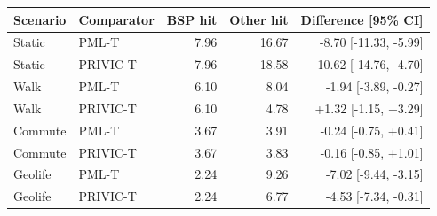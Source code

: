 \begin{tabular}{llrrr}
\toprule
Scenario & Comparator & BSP hit & Other hit & Difference [95\% CI] \\
\midrule
Static & PML-T & 7.96 & 16.67 & -8.70 [-11.33, -5.99] \\
Static & PRIVIC-T & 7.96 & 18.58 & -10.62 [-14.76, -4.70] \\
Walk & PML-T & 6.10 & 8.04 & -1.94 [-3.89, -0.27] \\
Walk & PRIVIC-T & 6.10 & 4.78 & +1.32 [-1.15, +3.29] \\
Commute & PML-T & 3.67 & 3.91 & -0.24 [-0.75, +0.41] \\
Commute & PRIVIC-T & 3.67 & 3.83 & -0.16 [-0.85, +1.01] \\
Geolife & PML-T & 2.24 & 9.26 & -7.02 [-9.44, -3.15] \\
Geolife & PRIVIC-T & 2.24 & 6.77 & -4.53 [-7.34, -0.31] \\
\bottomrule
\end{tabular}
